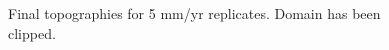 \documentclass[a4paper]{article}
\begin{document}
\begin{appendices}
\begin{figure}[!ht]
	\caption{Final topographies for 5 mm/yr replicates. Domain has been clipped.}
	\label{fig:005topo}
\end{figure}


\end{appendices}
\end{document}
